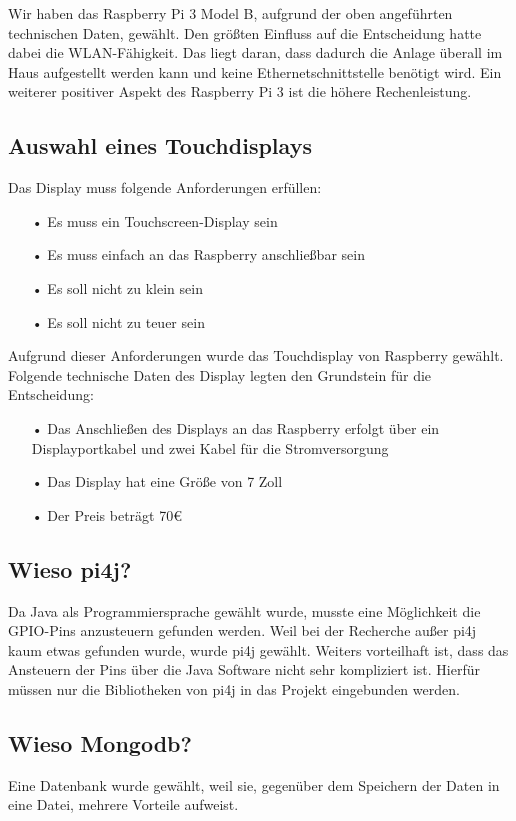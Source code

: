 Wir haben das Raspberry Pi 3 Model B, aufgrund der oben angeführten technischen Daten, gewählt. Den größten Einfluss auf die Entscheidung hatte dabei die \ac{WLAN}-Fähigkeit. Das liegt daran, dass dadurch die Anlage überall im Haus aufgestellt werden kann und keine Ethernetschnittstelle benötigt wird. Ein weiterer positiver Aspekt des Raspberry Pi 3 ist die höhere Rechenleistung.

\subsection{Auswahl eines Touchdisplays}
Das Display muss folgende Anforderungen erfüllen:
\begin{itemize}
\item[•] Es muss ein Touchscreen-Display sein
\item[•] Es muss einfach an das Raspberry anschließbar sein
\item[•] Es soll nicht zu klein sein
\item[•] Es soll nicht zu teuer sein
\end{itemize}

Aufgrund dieser Anforderungen wurde das Touchdisplay von Raspberry gewählt.
\\ Folgende technische Daten des Display legten den Grundstein für die Entscheidung:
\begin{itemize}
\item[•] Das Anschließen des Displays an das Raspberry erfolgt über ein Displayportkabel und zwei Kabel für die Stromversorgung
\item[•] Das Display hat eine Größe von 7 Zoll
\item[•] Der Preis beträgt 70\euro{}
\end{itemize}

\subsection{Wieso pi4j?}
Da Java als Programmiersprache gewählt wurde, musste eine Möglichkeit die \ac{GPIO}-Pins anzusteuern gefunden werden.
Weil bei der Recherche außer \ac{pi4j} kaum etwas gefunden wurde, wurde \ac{pi4j} gewählt. Weiters vorteilhaft ist, dass das Ansteuern der Pins über die Java Software nicht sehr kompliziert ist. Hierfür müssen nur die Bibliotheken von \ac{pi4j} in das Projekt eingebunden werden.

\subsection{Wieso Mongodb?}
Eine Datenbank wurde gewählt, weil sie, gegenüber dem Speichern der Daten in eine Datei, mehrere Vorteile aufweist. 
